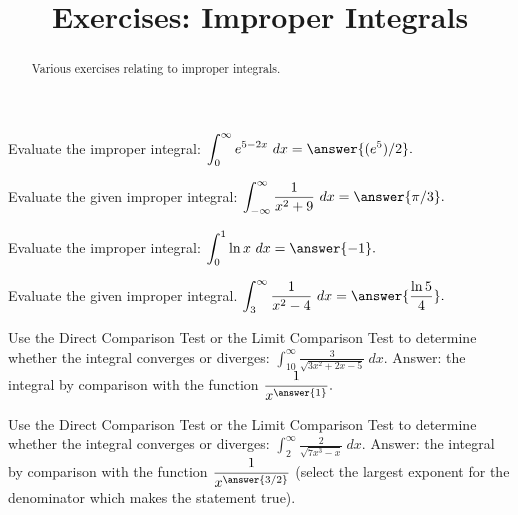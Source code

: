 \documentclass{ximera}
\title{Exercises: Improper Integrals}
\begin{document}
\begin{abstract}
Various exercises relating to improper integrals.
\end{abstract}
\maketitle

\begin{exercise}%
Evaluate the improper integral: \(\displaystyle \int_0^\infty e^{5-2x}\ dx = \answer{(e^5)/2}.\)
%
%
\end{exercise}

\begin{exercise}%
Evaluate the given improper integral: \(\displaystyle \int_{-\infty}^\infty \frac{1}{x^2+9}\ dx = \answer{\pi/3}.\)
%
%
\end{exercise}

\begin{exercise}
Evaluate the improper integral: \(\displaystyle \int_0^1 \ln x \ dx = \answer{-1}.\)
\end{exercise}

\begin{exercise}%
Evaluate the given improper integral. \(\displaystyle \int_{3}^\infty\frac{1}{x^2-4}\ dx = \answer{\frac{\ln 5}{4}}.\)
%
%
\end{exercise}

\begin{exercise}%
Use the Direct Comparison Test or the Limit Comparison Test to determine whether the integral converges or diverges:
 \(\displaystyle \int_{10}^\infty \frac{3}{\sqrt{3x^2+2x-5}} \ dx.\)
 Answer: the integral 
  by  comparison with the function $\displaystyle \frac{1}{x^{\answer{1}}}.$
%
%
\end{exercise}

\begin{exercise}
Use the Direct Comparison Test or the Limit Comparison Test to determine whether the integral converges or diverges:
 \(\displaystyle \int_{2}^\infty \frac{2}{\sqrt{7x^3-x}} \ dx.\)
 Answer: the integral 
  by  comparison with the function $\displaystyle \frac{1}{x^{\answer{3/2}}}$ (select the largest exponent for the denominator which makes the statement true).
\end{exercise}
\end{document}
